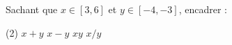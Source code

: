%
%
 Sachant que $x \in [3,6]$ et $y \in [-4,-3]$, encadrer :
\begin{tasks}(2)
\task  $x+y$
\task  $x-y$
\task  $xy$
\task  $x/y$
\end{tasks}
